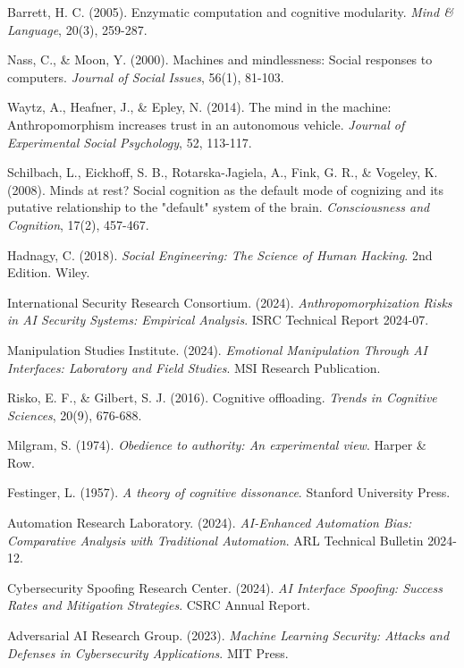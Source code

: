 \documentclass[11pt,a4paper]{article}
\begin{document}
\begin{thebibliography}{99}
Barrett, H. C. (2005). Enzymatic computation and cognitive modularity. \textit{Mind \& Language}, 20(3), 259-287.

Nass, C., \& Moon, Y. (2000). Machines and mindlessness: Social responses to computers. \textit{Journal of Social Issues}, 56(1), 81-103.

Waytz, A., Heafner, J., \& Epley, N. (2014). The mind in the machine: Anthropomorphism increases trust in an autonomous vehicle. \textit{Journal of Experimental Social Psychology}, 52, 113-117.

Schilbach, L., Eickhoff, S. B., Rotarska-Jagiela, A., Fink, G. R., \& Vogeley, K. (2008). Minds at rest? Social cognition as the default mode of cognizing and its putative relationship to the "default" system of the brain. \textit{Consciousness and Cognition}, 17(2), 457-467.

Hadnagy, C. (2018). \textit{Social Engineering: The Science of Human Hacking}. 2nd Edition. Wiley.

International Security Research Consortium. (2024). \textit{Anthropomorphization Risks in AI Security Systems: Empirical Analysis}. ISRC Technical Report 2024-07.

Manipulation Studies Institute. (2024). \textit{Emotional Manipulation Through AI Interfaces: Laboratory and Field Studies}. MSI Research Publication.

Risko, E. F., \& Gilbert, S. J. (2016). Cognitive offloading. \textit{Trends in Cognitive Sciences}, 20(9), 676-688.

Milgram, S. (1974). \textit{Obedience to authority: An experimental view}. Harper \& Row.

Festinger, L. (1957). \textit{A theory of cognitive dissonance}. Stanford University Press.

Automation Research Laboratory. (2024). \textit{AI-Enhanced Automation Bias: Comparative Analysis with Traditional Automation}. ARL Technical Bulletin 2024-12.

Cybersecurity Spoofing Research Center. (2024). \textit{AI Interface Spoofing: Success Rates and Mitigation Strategies}. CSRC Annual Report.

Adversarial AI Research Group. (2023). \textit{Machine Learning Security: Attacks and Defenses in Cybersecurity Applications}. MIT Press.


\end{thebibliography}
\end{document}
